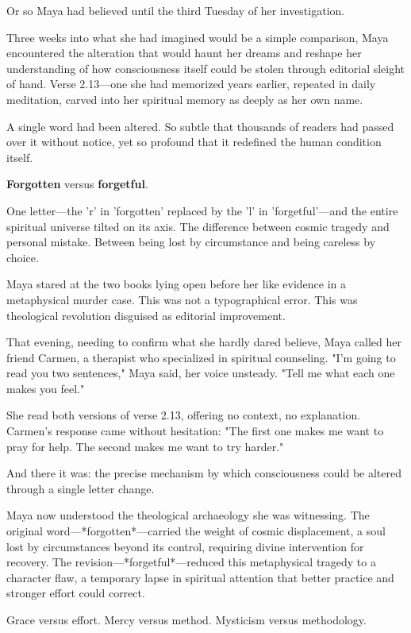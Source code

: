 \documentclass[11pt,twoside]{book}
\begin{document}
Or so Maya had believed until the third Tuesday of her investigation.

Three weeks into what she had imagined would be a simple comparison, Maya encountered the alteration that would haunt her dreams and reshape her understanding of how consciousness itself could be stolen through editorial sleight of hand. Verse 2.13—one she had memorized years earlier, repeated in daily meditation, carved into her spiritual memory as deeply as her own name.

A single word had been altered. So subtle that thousands of readers had passed over it without notice, yet so profound that it redefined the human condition itself.

\textbf{Forgotten} versus \textbf{forgetful}. 

One letter—the 'r' in 'forgotten' replaced by the 'l' in 'forgetful'—and the entire spiritual universe tilted on its axis. The difference between cosmic tragedy and personal mistake. Between being lost by circumstance and being careless by choice.

Maya stared at the two books lying open before her like evidence in a metaphysical murder case. This was not a typographical error. This was theological revolution disguised as editorial improvement.

That evening, needing to confirm what she hardly dared believe, Maya called her friend Carmen, a therapist who specialized in spiritual counseling. "I'm going to read you two sentences," Maya said, her voice unsteady. "Tell me what each one makes you feel."

She read both versions of verse 2.13, offering no context, no explanation. Carmen's response came without hesitation: "The first one makes me want to pray for help. The second makes me want to try harder."

And there it was: the precise mechanism by which consciousness could be altered through a single letter change.

Maya now understood the theological archaeology she was witnessing. The original word—*forgotten*—carried the weight of cosmic displacement, a soul lost by circumstances beyond its control, requiring divine intervention for recovery. The revision—*forgetful*—reduced this metaphysical tragedy to a character flaw, a temporary lapse in spiritual attention that better practice and stronger effort could correct.

Grace versus effort. Mercy versus method. Mysticism versus methodology.
\end{document}
